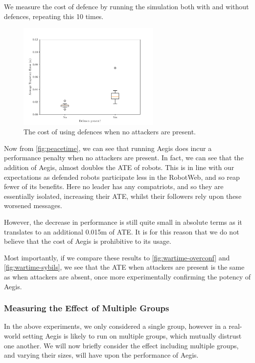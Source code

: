 We measure the cost of defence by running the simulation both with and without defences, repeating this 10 times.
\begin{figure}[!h]
	\centering
        \includegraphics[width=7cm]{report/graphs/peacetime.pdf}
	\caption{The cost of using defences when no attackers are present.}
        \label{fig:peacetime}
\end{figure}

Now from \autoref{fig:peacetime}, we can see that running Aegis does incur a performance penalty when no attackers are present. In fact, we can see that the addition of Aegis, almost doubles the ATE of robots. This is in line with our expectations as defended robots participate less in the RobotWeb, and so reap fewer of its benefits. Here no leader has any compatriots, and so they are essentially isolated, increasing their ATE, whilst their followers rely upon these worsened messages.

However, the decrease in performance is still quite small in absolute terms as it translates to an additional 0.015m of ATE. It is for this reason that we do not believe that the cost of Aegis is prohibitive to its usage.

Most importantly, if we compare these results to \autoref{fig:wartime-overconf} and \autoref{fig:wartime-sybils}, we see that the ATE when attackers are present is the same as when attackers are absent, once more experimentally confirming the potency of Aegis.

\subsubsection{Measuring the Effect of Multiple Groups}
In the above experiments, we only considered a single group, however in a real-world setting Aegis is likely to run on multiple groups, which mutually distrust one another. We will now briefly consider the effect including multiple groups, and varying their sizes, will have upon the performance of Aegis.

